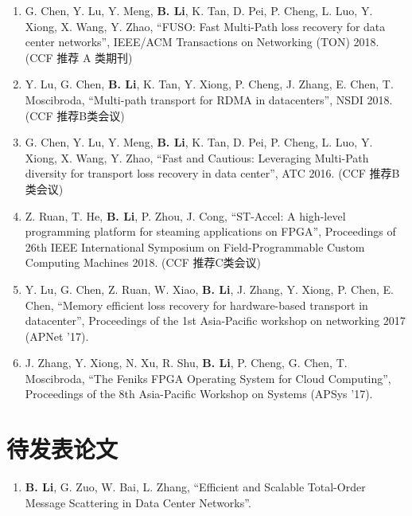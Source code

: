 \begin{publications}
\begin{enumerate}
\item G. Chen, Y. Lu, Y. Meng, \textbf{B. Li}, K. Tan, D. Pei, P. Cheng, L. Luo, Y. Xiong, X. Wang, Y. Zhao, ``FUSO: Fast Multi-Path loss recovery for data center networks'', IEEE/ACM Transactions on Networking (TON) 2018. (CCF 推荐 A 类期刊)
\item Y. Lu, G. Chen, \textbf{B. Li}, K. Tan, Y. Xiong, P. Cheng, J. Zhang, E. Chen, T. Moscibroda, ``Multi-path transport for RDMA in datacenters'', NSDI 2018. (CCF 推荐B类会议)
\item G. Chen, Y. Lu, Y. Meng, \textbf{B. Li}, K. Tan, D. Pei, P. Cheng, L. Luo, Y. Xiong, X. Wang, Y. Zhao, “Fast and Cautious: Leveraging Multi-Path diversity for transport loss recovery in data center”, ATC 2016. (CCF 推荐B类会议)
\item Z. Ruan, T. He, \textbf{B. Li}, P. Zhou, J. Cong, “ST-Accel: A high-level programming platform for steaming applications on FPGA”, Proceedings of 26th IEEE International Symposium on Field-Programmable Custom Computing Machines 2018. (CCF 推荐C类会议)
\item Y. Lu, G. Chen, Z. Ruan, W. Xiao, \textbf{B. Li}, J. Zhang, Y. Xiong, P. Chen, E. Chen, ``Memory efficient loss recovery for hardware-based transport in datacenter'', Proceedings of the 1st Asia-Pacific workshop on networking 2017 (APNet '17).
\item J. Zhang, Y. Xiong, N. Xu, R. Shu, \textbf{B. Li}, P. Cheng, G. Chen, T. Moscibroda, ``The Feniks FPGA Operating System for Cloud Computing'', Proceedings of the 8th Asia-Pacific Workshop on Systems (APSys '17).
\end{enumerate}

\section*{待发表论文}

\begin{enumerate}
\item \textbf{B. Li}, G. Zuo, W. Bai, L. Zhang, ``Efficient and Scalable Total-Order Message Scattering in Data Center Networks''.
\end{enumerate}


\end{publications}
